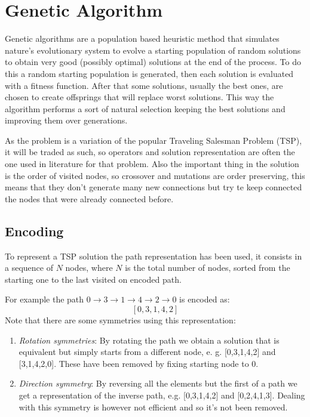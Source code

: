 \section{Genetic Algorithm}
	Genetic algorithms are a population based heuristic method that simulates nature's evolutionary system to evolve a starting population of random solutions to obtain very good (possibly optimal) solutions at the end of the process. To do this a random starting population is generated, then each solution is evaluated with a fitness function. After that some solutions, usually the best ones, are chosen to create offsprings that will replace worst solutions. This way the algorithm performs a sort of natural selection keeping the best solutions and improving them over generations.
	
	As the problem is a variation of the popular Traveling Salesman Problem (TSP), it will be traded as such, so operators and solution representation are often the one used in literature for that problem. Also the important thing in the solution is the order of visited nodes, so crossover and mutations are order preserving, this means that they don't generate many new connections but try te keep connected the nodes that were already connected before.
		
	\subsection{Encoding}
		To represent a TSP solution the path representation has been used, it consists in a sequence of $N$ nodes, where $N$ is the total number of nodes, sorted from the starting one to the last visited on encoded path.
		
		For example the path $0 \rightarrow 3 \rightarrow 1 \rightarrow 4 \rightarrow 2 \rightarrow 0$ is encoded as:
		\[[0, 3, 1, 4, 2]\]
		Note that there are some symmetries using this representation:
		\begin{enumerate}
			\item \textit{Rotation symmetries}: By rotating the path we obtain a solution that is equivalent but simply starts from a different node, e. g. [0,3,1,4,2] and [3,1,4,2,0]. These have been removed by fixing starting node to 0.
			\item \textit{Direction symmetry}: By reversing all the elements but the first of a path we get a representation of the inverse path, e.g. [0,3,1,4,2] and [0,2,4,1,3]. Dealing with this symmetry is however not efficient and so it's not been removed.
		\end{enumerate}
	
